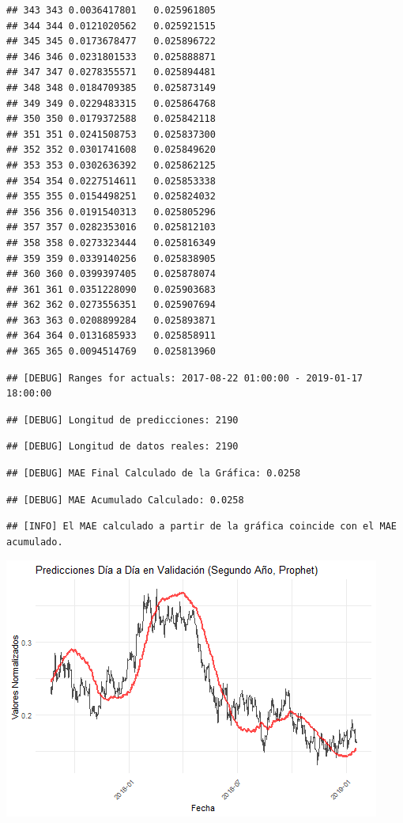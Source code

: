 \documentclass[
]{book}
\begin{document}
\begin{verbatim}
## 343 343 0.0036417801   0.025961805
## 344 344 0.0121020562   0.025921515
## 345 345 0.0173678477   0.025896722
## 346 346 0.0231801533   0.025888871
## 347 347 0.0278355571   0.025894481
## 348 348 0.0184709385   0.025873149
## 349 349 0.0229483315   0.025864768
## 350 350 0.0179372588   0.025842118
## 351 351 0.0241508753   0.025837300
## 352 352 0.0301741608   0.025849620
## 353 353 0.0302636392   0.025862125
## 354 354 0.0227514611   0.025853338
## 355 355 0.0154498251   0.025824032
## 356 356 0.0191540313   0.025805296
## 357 357 0.0282353016   0.025812103
## 358 358 0.0273323444   0.025816349
## 359 359 0.0339140256   0.025838905
## 360 360 0.0399397405   0.025878074
## 361 361 0.0351228090   0.025903683
## 362 362 0.0273556351   0.025907694
## 363 363 0.0208899284   0.025893871
## 364 364 0.0131685933   0.025858911
## 365 365 0.0094514769   0.025813960
\end{verbatim}

\begin{verbatim}
## [DEBUG] Ranges for actuals: 2017-08-22 01:00:00 - 2019-01-17 18:00:00
\end{verbatim}

\begin{verbatim}
## [DEBUG] Longitud de predicciones: 2190
\end{verbatim}

\begin{verbatim}
## [DEBUG] Longitud de datos reales: 2190
\end{verbatim}

\begin{verbatim}
## [DEBUG] MAE Final Calculado de la Gráfica: 0.0258
\end{verbatim}

\begin{verbatim}
## [DEBUG] MAE Acumulado Calculado: 0.0258
\end{verbatim}

\begin{verbatim}
## [INFO] El MAE calculado a partir de la gráfica coincide con el MAE acumulado.
\end{verbatim}

\includegraphics{bookdown_time_series_files/figure-latex/unnamed-chunk-14-1.png}
\end{document}
